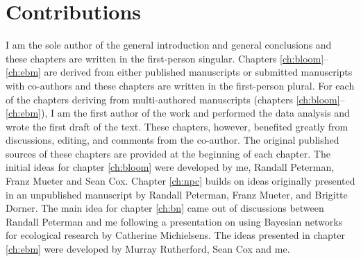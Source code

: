 \section{Contributions}

I am the sole author of the general introduction and general conclusions and
these chapters are written in the first-person singular. Chapters
\ref{ch:bloom}--\ref{ch:ebm} are derived from either published manuscripts or
submitted manuscripts with co-authors and these chapters are written in the
first-person plural. For each of the chapters deriving from multi-authored
manuscripts (chapters \ref{ch:bloom}--\ref{ch:ebm}), I am the first author of
the work and performed the data analysis and wrote the first draft of the text.
These chapters, however, benefited greatly from discussions, editing, and
comments from the co-author. The original published sources of these chapters
are provided at the beginning of each chapter. The initial ideas for chapter
\ref{ch:bloom} were developed by me, Randall Peterman, Franz Mueter and Sean
Cox. Chapter \ref{ch:npc} builds on ideas originally presented in an unpublished
manuscript by Randall Peterman, Franz Mueter, and Brigitte Dorner. The main idea
for chapter \ref{ch:bn} came out of discussions between Randall Peterman and me
following a presentation on using Bayesian networks for ecological research by
Catherine Michielsens. The ideas presented in chapter \ref{ch:ebm} were
developed by Murray Rutherford, Sean Cox and me.

